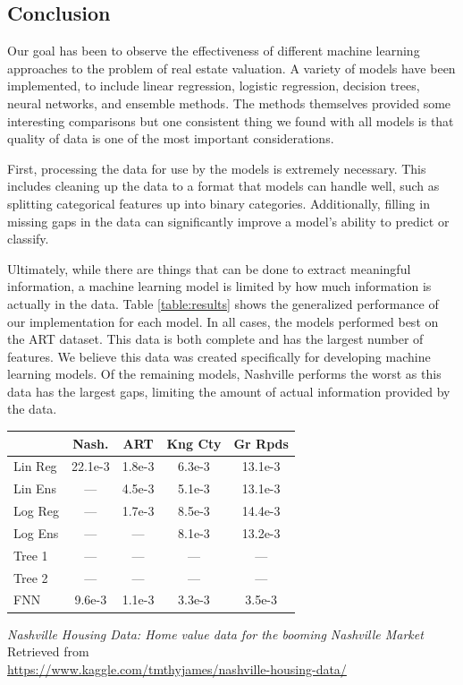 \documentclass[10pt]{article}
\begin{document}
\begin{multicols}{2}
 		\section{Conclusion}
 		Our goal has been to observe the effectiveness of different machine learning approaches to the problem of real estate valuation. A variety of models have been implemented, to include linear regression, logistic regression, decision trees, neural networks, and ensemble methods. The methods themselves provided some interesting comparisons but one consistent thing we found with all models is that quality of data is one of the most important considerations.

		First, processing the data for use by the models is extremely necessary. This includes cleaning up the data to a format that models can handle well, such as splitting categorical features up into binary categories. Additionally, filling in missing gaps in the data can significantly improve a model's ability to predict or classify.

		Ultimately, while there are things that can be done to extract meaningful information, a machine learning model is limited by how much information is actually in the data.  Table \ref{table:results} shows the generalized performance of our implementation for each model.  In all cases, the models performed best on the ART dataset.  This data is both complete and has the largest number of features.  We believe this data was created specifically for developing machine learning models.  Of the remaining models, Nashville performs the worst as this data has the largest gaps, limiting the amount of actual information provided by the data.
		
		\begin{center}
	        \captionsetup{type=table}
	        \begin{tabular}{l|c|c|c|c}
	        	        & Nash.   & ART     & Kng Cty & Gr Rpds  \\
	        	\hline
	        	Lin Reg & 22.1e-3 & 1.8e-3  & 6.3e-3  & 13.1e-3  \\
	        	Lin Ens & ---     & 4.5e-3  & 5.1e-3  & 13.1e-3  \\
	        	Log Reg & ---     & 1.7e-3  & 8.5e-3  & 14.4e-3  \\
	        	Log Ens & ---     & ---     & 8.1e-3  & 13.2e-3  \\
	        	Tree 1  & ---     & ---     & ---     & ---      \\
	        	Tree 2  & ---     & ---     & ---     & ---      \\
	        	FNN     & 9.6e-3  & 1.1e-3  & 3.3e-3  & 3.5e-3   \\	        	
	        \end{tabular}
			\label{table:results}
		\end{center}
		\begin{thebibliography}{13}
			\textit{Nashville Housing Data: Home value data for the booming Nashville Market}
			Retrieved from \\ \small{\url{https://www.kaggle.com/tmthyjames/nashville-housing-data/}}
			

\end{thebibliography}
\end{multicols}
\end{document}
